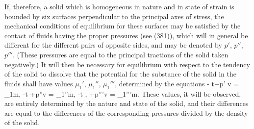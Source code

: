 \documentclass[12pt]{article}
\begin{document}
{If, therefore, a solid which is homogeneous in nature and in state of strain is bounded by six surfaces perpendicular to the principal axes of stress, the mechanical conditions of equilibrium for these surfaces may be satisfied by the contact of fluids having the proper pressures (see (381)), which will in general be different for the different pairs of opposite sides, and may be denoted by $p'$, $p''$, $p'''$. (These pressures are equal to the principal tractions of the solid taken negatively.) It will then be necessary for equilibrium with respect to the tendency of the solid to dissolve that the potential for the substance of the solid in the fluids shall have values $\mu_1'$, $\mu_1''$, $\mu_1'''$, determined by the equations
\eqs \epsilon- t\eta +p' v  = \mu_1m,     \label{393}\eqe
\eqs \epsilon-t \eta +p''v =   \mu_1''m,    \label{394}\eqe
\eqs \epsilon-t \eta, +p'''v = \mu_1'''m.    \label{395}\eqe
These values, it will be observed, are entirely determined by the nature and state of the solid, and their differences are equal to the differences of the corresponding pressures divided by the density of the solid.


}
\end{document}
